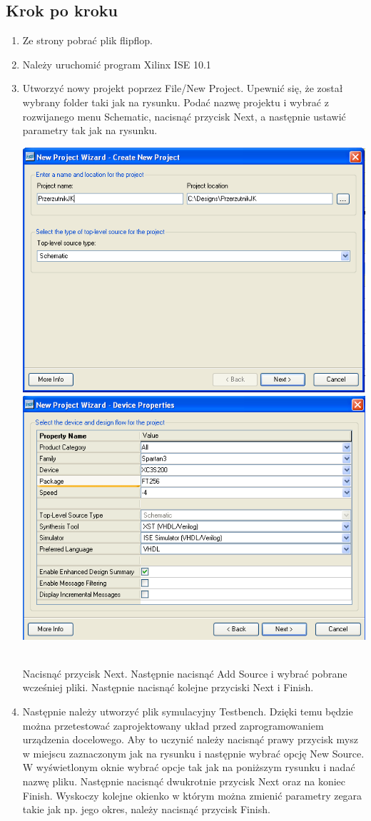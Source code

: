 \documentclass[12pt]{article}
\begin{document}
\subsection{Krok po kroku}
\begin{enumerate}[wide, labelwidth=!, labelindent=0pt]	
\item Ze strony pobrać plik flipflop.
\item Należy uruchomić program Xilinx ISE 10.1
\item Utworzyć nowy projekt poprzez File/New Project. Upewnić się, że został wybrany folder taki jak na rysunku. Podać nazwę projektu i wybrać z rozwijanego menu Schematic, nacisnąć przycisk Next, a następnie ustawić parametry tak jak na rysunku.\\
\centerline{
\includegraphics[width=0.49\linewidth]{1.PNG}
\includegraphics[width=0.49\linewidth]{2.PNG}
} \\
Nacisnąć przycisk Next. Następnie nacisnąć Add Source i wybrać pobrane wcześniej pliki. Następnie nacisnąć kolejne przyciski Next i Finish.
\item Następnie należy utworzyć plik symulacyjny Testbench. Dzięki temu będzie można przetestować zaprojektowany układ przed zaprogramowaniem urządzenia docelowego. Aby to uczynić należy nacisnąć prawy przycisk mysz w miejscu zaznaczonym jak na rysunku i następnie wybrać opcję New Source. W wyświetlonym oknie wybrać opcje tak jak na poniższym rysunku i nadać nazwę pliku. Następnie nacisnąć dwukrotnie przycisk Next oraz na koniec Finish. Wyskoczy kolejne okienko w którym można zmienić parametry zegara takie jak np. jego okres, należy nacisnąć przycisk Finish. \\

\end{enumerate}
\end{document}
